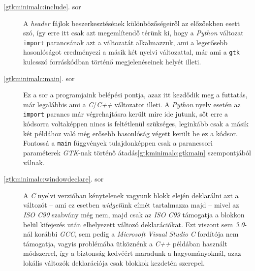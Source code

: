 \begin{description}
 \item[\ref{gtkminimalc:include}. sor] A \textit{header} fájlok beszerkesztésének különbözőségeiről az előzőekben esett szó, így erre itt csak azt megemlítendő térünk ki, hogy a \textit{Python} változat \texttt{import} parancsának azt a változatát alkalmazzuk, ami a legerősebb hasonlóságot eredményezi a másik két nyelvi változattal, már ami a \texttt{gtk} kulcsszó forráskódban történő megjelenéseinek helyét illeti.

 \item[\ref{gtkminimalc:main}. sor] Ez a sor a programjaink belépési pontja, azaz itt kezdődik meg a futtatás, már legalábbis ami a \textit{C}/\textit{C++} változatot illeti. A \textit{Python} nyelv esetén az \texttt{import} parancs már végrehajtásra került mire ide jutunk, sőt erre a kódsorra voltaképpen nincs is feltétlenül szükséges\cite[fej.~27.4.]{pythonlib}, leginkább csak a másik két példához való még erősebb hasonlóság végett került be ez a kódsor. Fontossá a \texttt{main} függvények tulajdonképpen csak a parancssori paraméterek \textit{GTK}-nak történő átadás\ref{gtkminimalc:gtkmain} szempontjából válnak.

 \item[\ref{gtkminimalc:windowdeclare}. sor] A \textit{C} nyelvi verzióban kénytelenek vagyunk blokk elején deklarálni azt a változót -- ami ez esetben \textit{widget}ünk címét tartalmazza majd -- mivel az \textit{ISO C90} szabvány még nem, majd csak az \textit{ISO C99} támogatja a blokkon belül kifejezés után elhelyezett változó deklarációkat. Ezt viszont sem \textit{3.0}-nál korábbi \textit{GCC}, sem pedig a \textit{Microsoft Visual Studio} \textit{C} fordítója nem támogatja, vagyis problémába ütköznénk a \textit{C++} példában használt módszerrel, így a biztonság kedvéért maradunk a hagyományoknál, azaz lokális változók deklarációja csak blokkok kezdetén szerepel.


\end{description}
